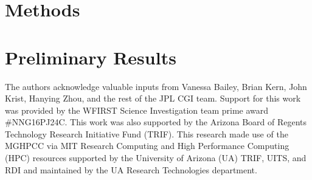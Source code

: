 \documentclass[]{spie}  %
\begin{document}
\section{Methods}



\section{Preliminary Results}

    
\acknowledgments %
The authors acknowledge valuable inputs from  Vanessa Bailey,  Brian Kern, John Krist, Hanying Zhou,   and the rest of the JPL CGI team.
 Support for this work was provided by the WFIRST Science Investigation team prime award \#NNG16PJ24C.
This work was also supported by the Arizona Board of Regents Technology Research
Initiative Fund (TRIF).
This research made use of the \gls{MGHPCC} via MIT Research Computing and High Performance Computing (HPC) resources supported by the University of Arizona (UA) TRIF, UITS, and RDI and maintained by the UA Research Technologies department.

\end{document}
